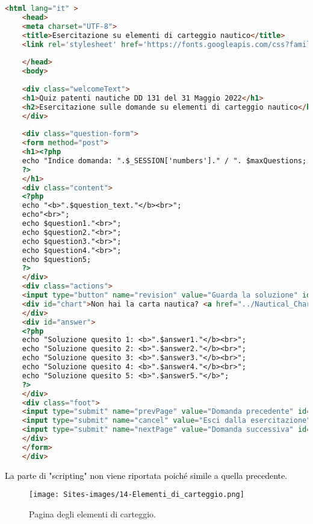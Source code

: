 \begin{lstlisting}[language=html]
	<html lang="it" >
	<head>
	<meta charset="UTF-8">
	<title>Esercitazione su elementi di carteggio nautico</title>
	<link rel='stylesheet' href='https://fonts.googleapis.com/css?family=Rubik:400,700'><link rel="stylesheet" href="exerciseStyle.css">
	
	</head>
	<body>  
	
	<div class="welcomeText">
	<h1>Quiz patenti nautiche DD 131 del 31 Maggio 2022</h1>
	<h2>Esercitazione sulle domande su elementi di carteggio nautico</h2>
	</div>
	
	<div class="question-form">
	<form method="post">
	<h1><?php
	echo "Indice domanda: ".$_SESSION['numbers']." / ". $maxQuestions;
	?>
	</h1>
	<div class="content">
	<?php 
	echo "<b>".$question_text."</b><br>";
	echo"<br>";
	echo $question1."<br>";
	echo $question2."<br>";
	echo $question3."<br>";
	echo $question4."<br>";
	echo $question5;
	?> 
	</div>
	<div class="actions">
	<input type="button" name="revision" value="Guarda la soluzione" id="revision" onclick="check()"/>
	<div id="chart">Non hai la carta nautica? <a href="../Nautical_Charts/Carta_Nautica_5D.pdf" download> Scaricala qui</a></div>
	</div>
	<div id="answer">
	<?php
	echo "Soluzione quesito 1: <b>".$answer1."</b><br>";
	echo "Soluzione quesito 2: <b>".$answer2."</b><br>";
	echo "Soluzione quesito 3: <b>".$answer3."</b><br>";
	echo "Soluzione quesito 4: <b>".$answer4."</b><br>";
	echo "Soluzione quesito 5: <b>".$answer5."</b>";
	?>
	</div>
	<div class="foot">
	<input type="submit" name="prevPage" value="Domanda precedente" id="button3"/>
	<input type="submit" name="cancel" value="Esci dalla esercitazione" id="button2"/>
	<input type="submit" name="nextPage" value="Domanda successiva" id="button1"/>
	</div>
	</form>
	</div>
\end{lstlisting}

\begin{minipage}{\textwidth}
	\raggedright
	\textcolor{black}{La parte di "scripting" non viene riportata poiché simile a quella precedente.}\\
\end{minipage}

\begin{minipage}{\textwidth}
	\begin{figure}[H]
		\begin{center}
			\texttt{[image: Sites-images/14-Elementi\_di\_carteggio.png]}
			\caption{Pagina degli elementi di carteggio.}
		\end{center}
	\end{figure}
\end{minipage}

